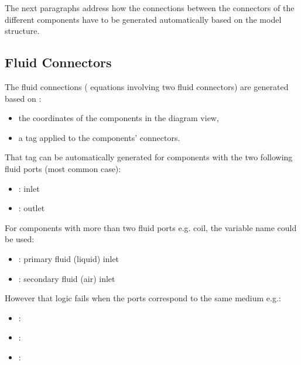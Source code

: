 \documentclass[letterpaper,10pt, openany,english]{sphinxmanual}
\begin{document}
The next paragraphs address how the connections between the connectors of the different components have to be generated automatically based on the model structure.


\subsection{Fluid Connectors}
\label{\detokenize{requirements:fluid-connectors}}
The fluid connections ( equations involving two fluid connectors) are generated based on :
\begin{itemize}
\item {} 
the coordinates of the components in the diagram view,

\item {} 
a tag applied to the components’ connectors.

\end{itemize}

That tag can be automatically generated for components with the two following fluid ports (most common case):
\begin{itemize}
\item {} 
: inlet

\item {} 
: outlet

\end{itemize}

For components with more than two fluid ports e.g. coil, the variable name could be used:
\begin{itemize}
\item {} 
: primary fluid (liquid) inlet

\item {} 
: secondary fluid (air) inlet

\end{itemize}

However that logic fails when the ports correspond to the same medium e.g.:
\begin{itemize}
\item {} 
: 

\item {} 
: 

\item {} 
: 

\end{itemize}
\end{document}
